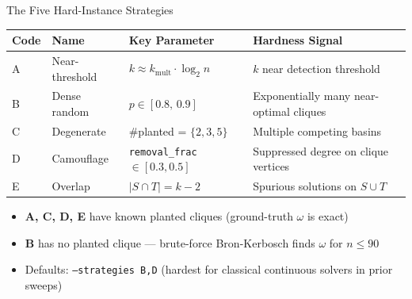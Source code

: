 \documentclass[aspectratio=169]{beamer}
\begin{document}
\begin{frame}{The Five Hard-Instance Strategies}
    \begin{table}
    \footnotesize
    \begin{tabular}{l l l l}
        \toprule
        \textbf{Code} & \textbf{Name} & \textbf{Key Parameter} & \textbf{Hardness Signal} \\
        \midrule
        A & Near-threshold  & $k \approx k_{\text{mult}}\!\cdot\!\log_2 n$ & $k$ near detection threshold \\
        B & Dense random    & $p \in [0.8,\,0.9]$                        & Exponentially many near-optimal cliques \\
        C & Degenerate      & \#planted = $\{2,3,5\}$                    & Multiple competing basins \\
        D & Camouflage      & \texttt{removal\_frac} $\in [0.3, 0.5]$     & Suppressed degree on clique vertices \\
        E & Overlap         & $|S \cap T| = k{-}2$                       & Spurious solutions on $S \cup T$ \\
        \bottomrule
    \end{tabular}
    \end{table}

    \vspace{0.5em}
    \begin{itemize}
        \item \textbf{A, C, D, E} have known planted cliques (ground-truth $\omega$ is exact)
        \item \textbf{B} has no planted clique --- brute-force Bron-Kerbosch finds $\omega$ for $n \leq 90$
        \item Defaults: \texttt{--strategies B,D} (hardest for classical continuous solvers in prior sweeps)
    \end{itemize}
\end{frame}

\end{document}
